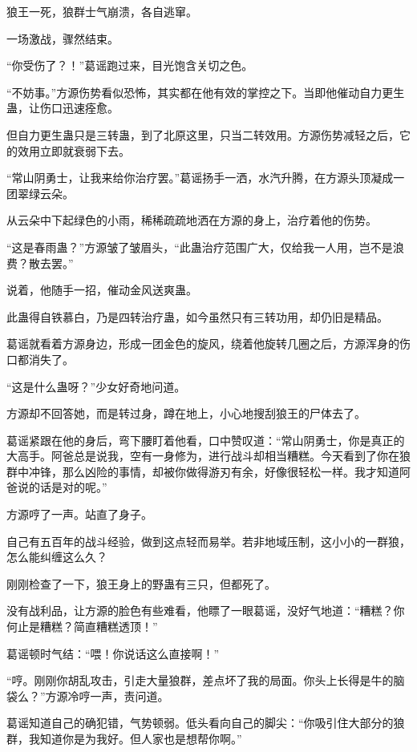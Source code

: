 
\begin{this_body}



狼王一死，狼群士气崩溃，各自逃窜。

一场激战，骤然结束。

“你受伤了？！”葛谣跑过来，目光饱含关切之色。

“不妨事。”方源伤势看似恐怖，其实都在他有效的掌控之下。当即他催动自力更生蛊，让伤口迅速痊愈。

但自力更生蛊只是三转蛊，到了北原这里，只当二转效用。方源伤势减轻之后，它的效用立即就衰弱下去。

“常山阴勇士，让我来给你治疗罢。”葛谣扬手一洒，水汽升腾，在方源头顶凝成一团翠绿云朵。

从云朵中下起绿色的小雨，稀稀疏疏地洒在方源的身上，治疗着他的伤势。

“这是春雨蛊？”方源皱了皱眉头，“此蛊治疗范围广大，仅给我一人用，岂不是浪费？散去罢。”

说着，他随手一招，催动金风送爽蛊。

此蛊得自铁慕白，乃是四转治疗蛊，如今虽然只有三转功用，却仍旧是精品。

葛谣就看着方源身边，形成一团金色的旋风，绕着他旋转几圈之后，方源浑身的伤口都消失了。

“这是什么蛊呀？”少女好奇地问道。

方源却不回答她，而是转过身，蹲在地上，小心地搜刮狼王的尸体去了。

葛谣紧跟在他的身后，弯下腰盯着他看，口中赞叹道：“常山阴勇士，你是真正的大高手。阿爸总是说我，空有一身修为，进行战斗却相当糟糕。今天看到了你在狼群中冲锋，那么凶险的事情，却被你做得游刃有余，好像很轻松一样。我才知道阿爸说的话是对的呢。”

方源哼了一声。站直了身子。

自己有五百年的战斗经验，做到这点轻而易举。若非地域压制，这小小的一群狼，怎么能纠缠这么久？

刚刚检查了一下，狼王身上的野蛊有三只，但都死了。

没有战利品，让方源的脸色有些难看，他瞟了一眼葛谣，没好气地道：“糟糕？你何止是糟糕？简直糟糕透顶！”

葛谣顿时气结：“喂！你说话这么直接啊！”

“哼。刚刚你胡乱攻击，引走大量狼群，差点坏了我的局面。你头上长得是牛的脑袋么？”方源冷哼一声，责问道。

葛谣知道自己的确犯错，气势顿弱。低头看向自己的脚尖：“你吸引住大部分的狼群，我知道你是为我好。但人家也是想帮你啊。”


\end{this_body}
